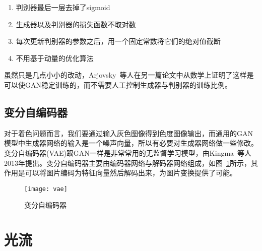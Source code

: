  \begin{enumerate}
    \item 判别器最后一层去掉了sigmoid
    \item 生成器以及判别器的损失函数不取对数
    \item 每次更新判别器的参数之后，用一个固定常数将它们的绝对值截断
    \item 不用基于动量的优化算法
  \end{enumerate}

  虽然只是几点小小的改动，Arjovsky~\cite{DBLP:journals/corr/ArjovskyB17}等人在另一篇论文中从数学上证明了这样是可以使GAN稳定训练的，而不需要人工控制生成器与判别器的训练比例。

\subsection{变分自编码器}
\label{sec:vae}
  
  对于着色问题而言，我们要通过输入灰色图像得到色度图像输出，而通用的GAN模型中生成器网络的输入是一个噪声向量，所以有必要对生成器网络做一些修改。变分自编码器(VAE)跟GAN一样是非常常用的无监督学习模型，由Kingma~\cite{DBLP:journals/corr/KingmaW13}等人2013年提出。变分自编码器主要由编码器网络与解码器网络组成，如图~\ref{fig:vae}所示，其作用是可以将图片编码为特征向量然后解码出来，为图片变换提供了可能。

  \begin{figure}[H]
    \centering
    \texttt{[image: vae]}
    \caption{变分自编码器}
    \label{fig:vae}
  \end{figure}

\section{光流}
\label{sec:optical-flow}


